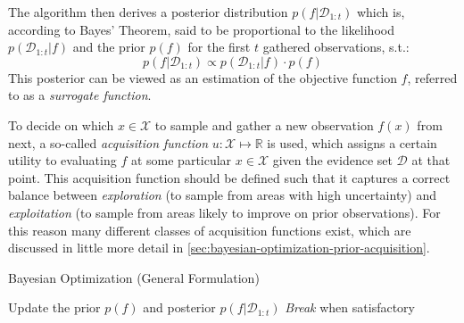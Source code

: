 The algorithm then derives a posterior distribution $p(f \vert \mathcal{D}_{1:t})$ which is, according to Bayes' Theorem, said to be proportional to the likelihood $p(\mathcal{D}_{1:t} \vert f)$ and the prior $p(f)$ for the first $t$ gathered observations, s.t.:
\begin{equation}
	p(f \vert \mathcal{D}_{1:t}) \propto p(\mathcal{D}_{1:t} \vert f) \cdot p(f)
\end{equation}
This posterior can be viewed as an estimation of the objective function $f$, referred to as a \textit{surrogate function}.

To decide on which $x \in \mathcal{X}$ to sample and gather a new observation $f(x)$ from next, a so-called \textit{acquisition function} $u: \mathcal{X} \mapsto \mathbb{R}$ is used, which assigns a certain utility to evaluating $f$ at some particular $x \in \mathcal{X}$ given the evidence set $\mathcal{D}$ at that point.
This acquisition function should be defined such that it captures a correct balance between \textit{exploration} (to sample from areas with high uncertainty) and \textit{exploitation} (to sample from areas likely to improve on prior observations). For this reason many different classes of acquisition functions exist, which are discussed in little more detail in \autoref{sec:bayesian-optimization-prior-acquisition}.


\begin{algorithm}
	\caption{Bayesian Optimization (General Formulation) \label{alg:bayesian-optimization}}
	\begin{algorithmic}[1]
		 
			 
			\State Update the prior $p(f)$ and posterior $p(f \vert \mathcal{D}_{1:t})$
			\State \textit{Break} when satisfactory 
		\EndFor
		\State {}
	\end{algorithmic}
\end{algorithm}

